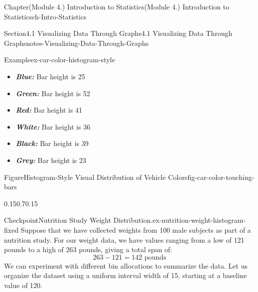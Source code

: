 \documentclass[oneside,10pt,]{book}
\newcommand{\tabularfont}{\relax}
\newcommand{\ptxlistdisc}{\raisebox{0.3ex}{\textbullet}}
\newcommand{\alert}[1]{\textbf{\textit{#1}}}
\begin{document}
\begin{chapterptx}{Chapter}{(Module 4.) Introduction to Statistics}{}{(Module 4.) Introduction to Statistics}{}{}{ch-Intro-Statistics}
\begin{sectionptx}{Section}{4.1 Visualizing Data Through Graphs}{}{4.1 Visualizing Data Through Graphs}{}{}{notes-Visualizing-Data-Through-Graphs}
\begin{example}{Example}{}{ex-car-color-histogram-style}
\par
%
\begin{itemize}[label=\ptxlistdisc]
\item{}\alert{Blue:} Bar height is 25%
\item{}\alert{Green:} Bar height is 52%
\item{}\alert{Red:} Bar height is 41%
\item{}\alert{White:} Bar height is 36%
\item{}\alert{Black:} Bar height is 39%
\item{}\alert{Grey:} Bar height is 23%
\end{itemize}
%
\begin{figureptx}{Figure}{Histogram-Style Visual Distribution of Vehicle Colors}{fig-car-color-touching-bars}{}%
\begin{image}{0.15}{0.7}{0.15}{}%
%
\end{image}%
\tcblower
\end{figureptx}%
\end{example}
\begin{inlineexercise}{Checkpoint}{Nutrition Study Weight Distribution.}{ex-nutrition-weight-histogram-fixed}%
Suppose that we have collected weights from 100 male subjects as part of a nutrition study. For our weight data, we have values ranging from a low of 121 pounds to a high of 263 pounds, giving a total span of:%
\begin{equation*}
263 - 121 = 142 \text{ pounds}
\end{equation*}
We can experiment with different bin allocations to summarize the data. Let us organize the dataset using a uniform interval width of 15, starting at a baseline value of 120.%
\begin{center}%
{\tabularfont%
}
\end{center}
\end{inlineexercise}
\end{sectionptx}
\end{chapterptx}
\end{document}
